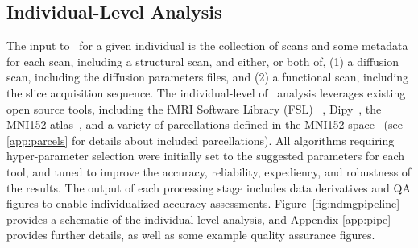 \documentclass[11pt]{article}
\begin{document}
\subsection{Individual-Level Analysis}

The input to \ndmg~for a given individual is  the collection of scans and some metadata for each scan, including a structural scan, %
and either, or both of, (1) a diffusion scan, including the diffusion parameters files,  and (2) a functional scan, including the slice acquisition sequence.
The individual-level of \ndmg~analysis leverages existing open source tools, including
the fMRI Software Library (FSL) ~\cite{fsl1, fsl2, fsl3}, Dipy~\cite{dipy}, the MNI152 atlas~\cite{mni152}, and a variety of parcellations defined in the MNI152 space~\cite{desikan, aal, jhu, harvardoxford, talairach, slab907, slab1068, pvt, glasser} (see \ref{app:parcels} for details about included parcellations). 
All algorithms requiring hyper-parameter selection were initially set to the suggested parameters for each tool, and tuned to improve the accuracy, reliability, expediency, and robustness of the results.
The output of each processing stage includes data derivatives and QA figures to enable individualized accuracy assessments.
Figure~\ref{fig:ndmgpipeline} provides a schematic of the individual-level analysis, and Appendix  
\ref{app:pipe} provides further details, as well as some example quality assurance figures.
\end{document}
